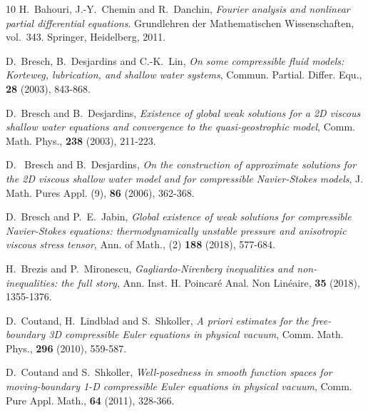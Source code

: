 \documentclass[11pt, reqno]{amsart}
\numberwithin{equation}{section}
\begin{document}
{\begin{thebibliography}{10}
 {\sc H.~Bahouri, J.-Y.~Chemin and R.~Danchin}, {\em Fourier analysis and nonlinear partial differential equations}. Grundlehren der Mathematischen Wissenschaften, vol.~343. Springer, Heidelberg, 2011.

 {\sc  D.~Bresch, B.~Desjardins and C.-K.~Lin}, {\em On some compressible fluid models: Korteweg, lubrication, and shallow water systems}, Commun. Partial. Differ. Equ., {\bf 28} (2003), 843-868.

 {\sc  D.~Bresch and B.~Desjardins}, {\em Existence of global weak solutions for a 2D viscous shallow water equations and convergence to the quasi-geostrophic model},  Comm. Math. Phys., {\bf 238} (2003), 211-223.

{\sc  D.~ Bresch and B.~Desjardins}, {\em On the construction of approximate solutions for the 2D viscous shallow water model and for compressible Navier-Stokes models}, J. Math. Pures Appl. (9), {\bf 86} (2006), 362-368.




{\sc  D.~Bresch and P.~E.~Jabin}, {\em Global existence of weak solutions for compressible Navier-Stokes equations: thermodynamically unstable pressure and anisotropic viscous stress tensor}, Ann. of Math., (2) {\bf 188} (2018), 577-684.


{\sc  H.~Brezis and P.~Mironescu}, {\em Gagliardo-Nirenberg inequalities and non-inequalities: the
full story}, Ann. Inst. H. Poincar\'{e} Anal. Non Lin\'{e}aire, {\bf 35} (2018), 1355-1376.



{\sc  D.~Coutand, H.~Lindblad and S.~Shkoller}, {\em A priori estimates for the free-boundary 3D compressible Euler equations in physical vacuum}, Comm. Math. Phys., {\bf 296} (2010), 559-587.

{\sc  D.~Coutand and S.~Shkoller}, {\em Well-posedness in smooth function spaces for moving-boundary 1-D compressible Euler equations in physical vacuum}, Comm. Pure Appl. Math., {\bf 64} (2011), 328-366.



\end{thebibliography}}
\end{document}
